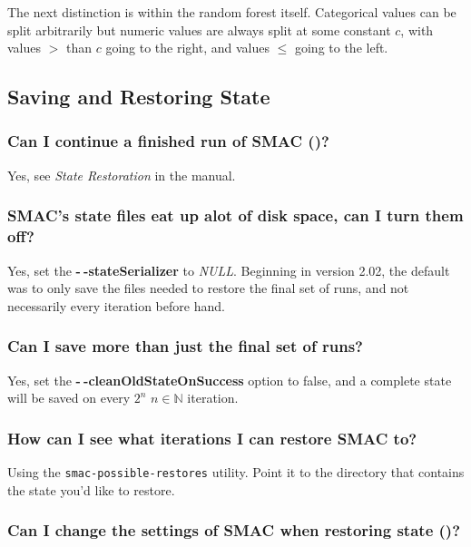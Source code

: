 \documentclass[11pt,letterpaper,oneside]{article}
\begin{document}
	The next distinction is within the random forest itself. Categorical values can be split arbitrarily but numeric values are always split at some constant $c$, with values $>$ than $c$ going to the right, and values $\leq$ going to the left.
		
\subsection{Saving and Restoring State}

\subsubsection{Can I continue a finished run of SMAC ()?}

	Yes, see \emph{State Restoration} in the manual.

\subsubsection{SMAC's state files eat up alot of disk space, can I turn them off?}

	Yes, set the \textbf{-$~\!$-stateSerializer} to \emph{NULL}. Beginning in version 2.02, the default was to only save the files needed to restore the final set of runs, and not necessarily every iteration before hand.
	
\subsubsection{Can I save more than just the final set of runs?}

	Yes, set the \textbf{-$~\!$-cleanOldStateOnSuccess} option to false, and a complete state will be saved on every $2^n$  $n\in\mathbb{N}$ iteration.

\subsubsection{How can I see what iterations I can restore SMAC to?}

	Using the \texttt{smac-possible-restores} utility. Point it to the directory that contains the state you'd like to restore.

\subsubsection{Can I change the settings of SMAC when restoring state ()?}
\end{document}

